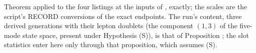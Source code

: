 Theorem  applied to the four listings at the inputs of , exactly; the scales are the script's RECORD conversions of the exact endpoints. The run's content, three derived generations with their lepton doublets (the component $(1,3)$ of the five-mode state space, present under Hypothesis (S)), is that of Proposition ; the slot statistics enter here only through that proposition, which assumes (S).
